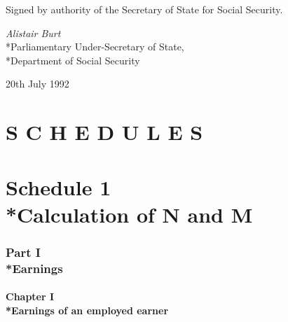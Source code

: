 \documentclass[12pt,a4paper]{article}
\begin{document}
\bigskip

Signed by authority of the Secretary of State for Social Security.

{\raggedleft
\emph{Alistair Burt}\\*Parliamentary Under-Secretary of State,\\*Department of Social Security

}

20th July 1992

\clearpage

\small

\part*{S C H E D U L E S}

\part[Schedule 1 --- Calculation of N and M]{Schedule 1\\*Calculation of N and M}

\section[Part I --- Earnings]{Part I\\*Earnings}

\subsection[Chapter I --- Earnings of an employed earner]{Chapter I\\*Earnings of an employed earner}

\renewcommand\parthead{--- Schedule 1 Part I Chapter I}
\end{document}
